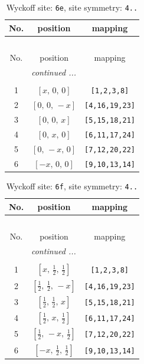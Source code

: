 \documentclass[fleqn,8pt]{jsarticle}
\begin{document}
\begin{longtable}{ccc}
\caption{Wyckoff site: {\tt 6e}, site symmetry: {\tt 4..}}
 \\
 \hline \hline
No. & position & mapping \\ \hline \endfirsthead

\multicolumn{2}{l}{\tablename\ \thetable{}} \\
 \hline \hline
No. & position & mapping \\ \hline \endhead

 \hline \hline
\multicolumn{2}{r}{\footnotesize\it continued ...} \\ \endfoot

 \hline \hline
\multicolumn{2}{r}{} \\ \endlastfoot

1 & $\left[ x,\, 0,\, 0 \right]$ & {\tt [1,2,3,8]} \\ \hline
2 & $\left[ 0,\, 0,\, - x \right]$ & {\tt [4,16,19,23]} \\ \hline
3 & $\left[ 0,\, 0,\, x \right]$ & {\tt [5,15,18,21]} \\ \hline
4 & $\left[ 0,\, x,\, 0 \right]$ & {\tt [6,11,17,24]} \\ \hline
5 & $\left[ 0,\, - x,\, 0 \right]$ & {\tt [7,12,20,22]} \\ \hline
6 & $\left[ - x,\, 0,\, 0 \right]$ & {\tt [9,10,13,14]} \\
\end{longtable}
\renewcommand{\arraystretch}{1.2}
\begin{longtable}{ccc}
\caption{Wyckoff site: {\tt 6f}, site symmetry: {\tt 4..}}
 \\
 \hline \hline
No. & position & mapping \\ \hline \endfirsthead

\multicolumn{2}{l}{\tablename\ \thetable{}} \\
 \hline \hline
No. & position & mapping \\ \hline \endhead

 \hline \hline
\multicolumn{2}{r}{\footnotesize\it continued ...} \\ \endfoot

 \hline \hline
\multicolumn{2}{r}{} \\ \endlastfoot

1 & $\left[ x,\, \frac{1}{2},\, \frac{1}{2} \right]$ & {\tt [1,2,3,8]} \\ \hline
2 & $\left[ \frac{1}{2},\, \frac{1}{2},\, - x \right]$ & {\tt [4,16,19,23]} \\ \hline
3 & $\left[ \frac{1}{2},\, \frac{1}{2},\, x \right]$ & {\tt [5,15,18,21]} \\ \hline
4 & $\left[ \frac{1}{2},\, x,\, \frac{1}{2} \right]$ & {\tt [6,11,17,24]} \\ \hline
5 & $\left[ \frac{1}{2},\, - x,\, \frac{1}{2} \right]$ & {\tt [7,12,20,22]} \\ \hline
6 & $\left[ - x,\, \frac{1}{2},\, \frac{1}{2} \right]$ & {\tt [9,10,13,14]} \\
\end{longtable}
\end{document}
